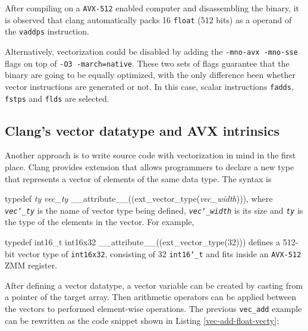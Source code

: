 \documentclass[logo,bsc,singlespacing,parskip]{infthesis}
\newcommand{\dtfloat}{\texttt{float}}
\newenvironment{VerbatimCompact}
  {\vspace*{-2.5mm}\VerbatimEnvironment
   \par\Verbatim}
  {\endVerbatim\vspace*{-2.4mm}}
\begin{document}
After compiling on a \texttt{AVX-512} enabled computer and disassembling the
binary, it is observed that clang automatically packs 16 \dtfloat{} (512 bits)
as a operand of the \texttt{vaddps} instruction. 

Alternatively, vectorization could be disabled by adding the \texttt{-mno-avx
-mno-sse} flags on top of \texttt{-O3 -march=native}. These two sets of flags
guarantee that the binary are going to be equally optimized, with the only
difference been whether vector instructions are generated or not. In this case,
scalar instructions \texttt{fadds}, \texttt{fstps} and \texttt{flds} are
selected.


\subsection{Clang's vector datatype and AVX intrinsics}

Another approach is to write source code with vectorization in mind in the first
place. Clang provides extension that allows programmers to declare a new type
that represents a vector of elements of the same data type. The syntax is 
\begin{VerbatimCompact}[commandchars=\\\{\}]
typedef \textit{ty} \textit{vec_ty} __attribute__((ext_vector_type(\textit{vec_width}))), 
\end{VerbatimCompact}
where \textit{\texttt{vec\char`_ty}} is the name of vector type being defined,
\textit{\texttt{vec\char`_width}} is its size and \textit{\texttt{ty}} is the
type of the elements in the vector. For example, 
\begin{VerbatimCompact}[commandchars=\\\{\}]
typedef int16_t int16x32 __attribute__((ext_vector_type(32)))
\end{VerbatimCompact}
defines a 512-bit vector type of \texttt{int16x32}, consisting of 32
\texttt{int16\char`_t} and fits inside an \texttt{AVX-512} ZMM register. 

After defining a vector datatype, a vector variable can be created by casting
from a pointer of the target array. Then arithmetic operators can be applied
between the vectors to performed element-wise operations. The previous
\texttt{vec\_add} example can be rewritten as the code snippet shown in Listing
\ref{vec-add-float-vecty}:
\end{document}
